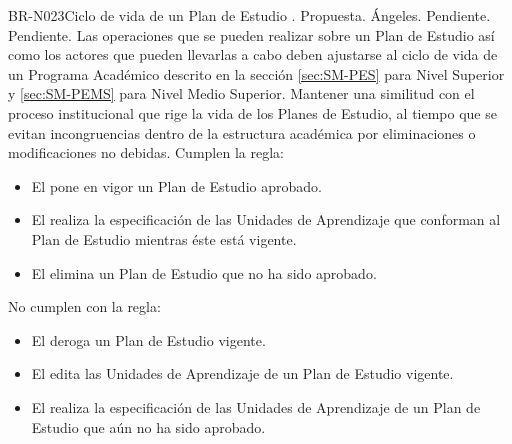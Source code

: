 \begin{BusinessRule}{BR-N023}{Ciclo de vida de un Plan de Estudio}
	{\bcAutorization}    %
	{\btEnabler}     %
	{\blControlling}    %
	.
	\BRItem[Estado] Propuesta.
	 Ángeles.
	 Pendiente.
	 Pendiente.
	\BRItem[Descripción] Las operaciones que se pueden realizar sobre un Plan de Estudio así como los actores que pueden llevarlas a cabo deben ajustarse al ciclo de vida de un Programa Académico descrito en la sección \ref{sec:SM-PES} para Nivel Superior y \ref{sec:SM-PEMS} para Nivel Medio Superior.
	\BRItem[Motivación] Mantener una similitud con el proceso institucional que rige la vida de los Planes de Estudio, al tiempo que se evitan incongruencias dentro de la estructura académica por eliminaciones o modificaciones no debidas.
	 Cumplen la regla:
		\begin{itemize}
			\item El  pone en vigor un Plan de Estudio aprobado.
			\item El  realiza la especificación de las Unidades de Aprendizaje que conforman al Plan de Estudio mientras éste está vigente.
			\item El  elimina un Plan de Estudio que no ha sido aprobado.
		\end{itemize}
	 No cumplen con la regla:
		\begin{itemize}
			\item El  deroga un Plan de Estudio vigente.
			\item El  edita las Unidades de Aprendizaje de un Plan de Estudio vigente.
			\item El  realiza la especificación de las Unidades de Aprendizaje de un Plan de Estudio que aún no ha sido aprobado.
		\end{itemize}
	
\end{BusinessRule}

